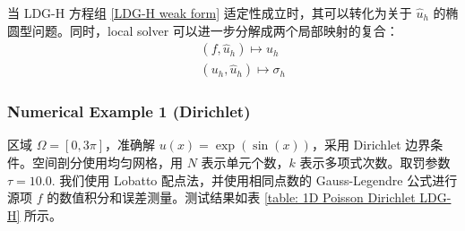 \begin{remark}
	当 LDG-H 方程组 \eqref{LDG-H weak form} 适定性成立时，其可以转化为关于 \(\widehat{u}_{h}\) 的椭圆型问题。同时，local solver 可以进一步分解成两个局部映射的复合：
	\begin{subequations}
		\begin{eqnarray}
			&& \left(f, \widehat{u}_{h}\right) \mapsto u_{h} \\
			&& \left(u_{h}, \widehat{u}_{h}\right) \mapsto \sigma_{h}
		\end{eqnarray}
	\end{subequations}
\end{remark}


\subsubsection{Numerical Example 1 (Dirichlet)}

区域 \(\Omega = [0,3\pi]\)，准确解 \(u(x) = \exp\left(\sin(x)\right)\)，采用 Dirichlet 边界条件。空间剖分使用均匀网格，用 \(N\) 表示单元个数，\(k\) 表示多项式次数。取罚参数 \(\tau = 10.0\). 我们使用 Lobatto 配点法，并使用相同点数的 Gauss-Legendre 公式进行源项 \(f\) 的数值积分和误差测量。测试结果如表 \ref{table: 1D Poisson Dirichlet LDG-H} 所示。

